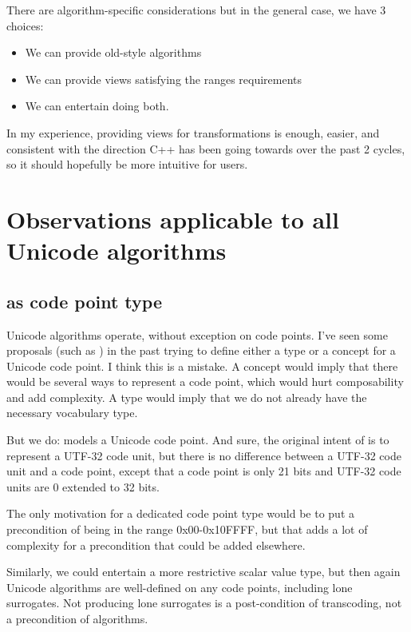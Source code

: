 \documentclass{wg21}
\begin{document}
There are algorithm-specific considerations but in the general case, we have 3 choices:

\begin{itemize}
    \item We can provide old-style algorithms
    \item We can provide views satisfying the ranges requirements
    \item We can entertain doing both.
\end{itemize}

In my experience, providing views for transformations is enough, easier, and consistent with the direction C++ has been going towards over the past 2 cycles, so it should hopefully be more intuitive for users.

\section{Observations applicable to all Unicode algorithms}

\subsection{ as code point type}

Unicode algorithms operate, without exception on code points.
I've seen some proposals (such as ) in the past trying to define either a type or a concept for a Unicode code point.
I think this is a mistake. A concept would imply that there would be several ways to represent a code point, which would hurt composability and add complexity.
A type would imply that we do not already have the necessary vocabulary type.

But we do:  models a Unicode code point. And sure, the original intent of  is to represent a UTF-32 code unit, but there is no
difference between a UTF-32 code unit and a code point, except that a code point is only 21 bits and UTF-32 code units are 0 extended to 32 bits.

The only motivation for a dedicated code point type would be to put a precondition of being in the range 0x00-0x10FFFF, but that adds a lot of complexity for a precondition that could be added elsewhere.

Similarly, we could entertain a more restrictive scalar value type, but then again Unicode algorithms are well-defined on any code points, including lone surrogates.
Not producing lone surrogates is a post-condition of transcoding, not a precondition of algorithms.
\end{document}
